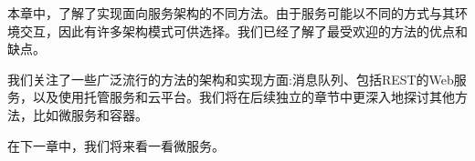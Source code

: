 本章中，了解了实现面向服务架构的不同方法。由于服务可能以不同的方式与其环境交互，因此有许多架构模式可供选择。我们已经了解了最受欢迎的方法的优点和缺点。

我们关注了一些广泛流行的方法的架构和实现方面:消息队列、包括REST的Web服务，以及使用托管服务和云平台。我们将在后续独立的章节中更深入地探讨其他方法，比如微服务和容器。

在下一章中，我们将来看一看微服务。